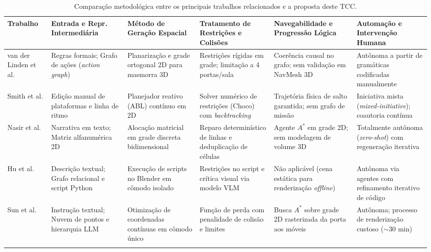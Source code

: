\begin{table}[H]
\centering
\caption{Comparação metodológica entre os principais trabalhos relacionados e a proposta deste TCC.}
\label{tab:comparativo_trabalhos_relacionados}
\scriptsize
\setlength{\tabcolsep}{2.2pt}
\renewcommand{\arraystretch}{0.95}
\begin{tabular}{@{}
  >{\raggedright\arraybackslash}p{2.15cm}
  >{\raggedright\arraybackslash}p{2.35cm}
  >{\raggedright\arraybackslash}p{2.45cm}
  >{\raggedright\arraybackslash}p{2.70cm}
  >{\raggedright\arraybackslash}p{2.85cm}
  >{\raggedright\arraybackslash}p{2.45cm}@{}}
\toprule
\textbf{Trabalho} & \textbf{Entrada e Repr. Intermediária} & \textbf{Método de Geração Espacial} & \textbf{Tratamento de Restrições e Colisões} & \textbf{Navegabilidade e Progressão Lógica} & \textbf{Automação e Intervenção Humana} \\ \midrule
van der Linden et al. \cite*{linden2013designing} & Regras formais; Grafo de ações (\textit{action graph}) & Planarização e grade ortogonal 2D para masmorra 3D & Restrições rígidas em grade; limitação a 4 portas/sala & Coerência causal no grafo; sem validação em NavMesh 3D & Autônoma a partir de gramáticas codificadas manualmente \\ \addlinespace[1pt]
Smith et al. \cite*{tanagra} & Edição manual de plataformas e linha de ritmo & Planejador reativo (ABL) contínuo em 2D & Solver numérico de restrições (Choco) com \textit{backtracking} & Trajetória física de salto garantida; sem grafo de missão & Iniciativa mista (\textit{mixed-initiative}); coautoria contínua \\ \addlinespace[1pt]
Nasir et al. \cite*{nasir2024word2worldgeneratingstoriesworlds} & Narrativa em texto; Matriz alfanumérica 2D & Alocação matricial em grade discreta bidimensional & Reparo determinístico de linhas e deduplicação de células & Agente $A^*$ em grade 2D; sem modelagem de volume 3D & Totalmente autônoma (\textit{zero-shot}) com regeneração iterativa \\ \addlinespace[1pt]
Hu et al. \cite*{hu2024scenecraft} & Descrição textual; Grafo relacional e script Python & Execução de scripts no Blender em cômodo isolado & Restrições no script e crítica visual via modelo VLM & Não aplicável (cena estática para renderização \textit{offline}) & Autônoma via agentes com refinamento iterativo de código \\ \addlinespace[1pt]
Sun et al. \cite*{sun2024roomplanner} & Instrução textual; Nuvem de pontos e hierarquia LLM & Otimização de coordenadas contínuas em cômodo único & Função de perda com penalidade de colisão e limites & Busca $A^*$ sobre grade 2D rasterizada da porta aos móveis & Autônoma; processo de renderização custoso ($\sim$30 min) \\ \addlinespace[1pt]

\end{tabular}
\end{table}
